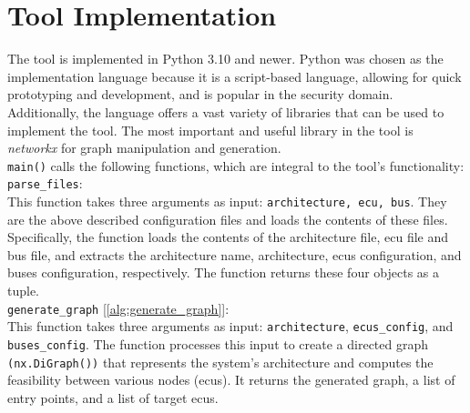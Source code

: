 \section{Tool Implementation}
\label{sec:implementation}

The tool is implemented in Python 3.10 and newer.
Python was chosen as the implementation language because it is a script-based language, allowing for quick prototyping and development,
and is popular in the security domain.
Additionally, the language offers a vast variety of libraries that can be used to implement the tool.
The most important and useful library in the tool is \textit{networkx} for graph manipulation and generation.\\

\texttt{main()} calls the following functions, which are integral to the tool's functionality:\\

\texttt{parse\_files}:\\
This function takes three arguments as input:
\texttt{architecture, ecu, bus}.
They are the above described configuration files and loads the contents of these files. 
Specifically, the function loads the contents of the architecture file, \acrshort{ecu} file and bus file, 
and extracts the architecture name, architecture, \acrshort{ecu}s configuration, and buses configuration, respectively. 
The function returns these four objects as a tuple.\\

\texttt{generate\_graph} [\ref{alg:generate_graph}]:\\
This function takes three arguments as input: 
\texttt{architecture}, \texttt{ecus\_config}, and \texttt{buses\_config}. 
The function processes this input to create a directed graph \texttt{(nx.DiGraph())} 
that represents the system's architecture and computes the feasibility between various nodes (\acrshort{ecu}s). 
It returns the generated graph, a list of entry points, and a list of target \acrshort{ecu}s.

